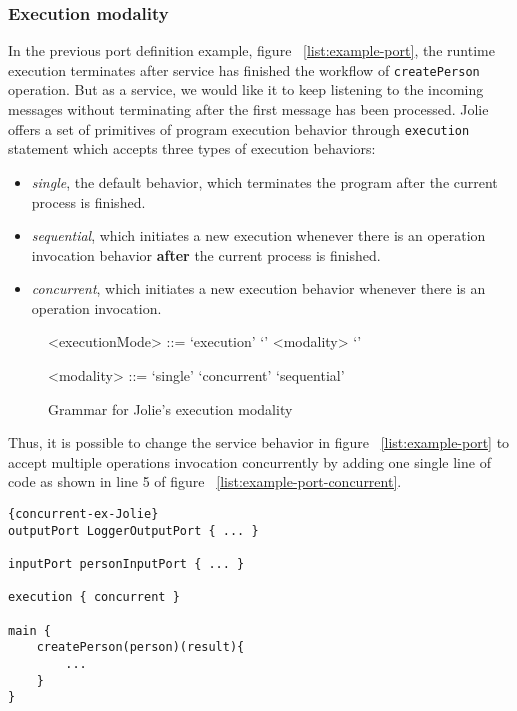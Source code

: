 \subsubsection{Execution modality}
\label{sec:jolie-execution-mode}

In the previous port definition example, figure ~\ref{list:example-port}, the runtime execution terminates after service has finished the workflow of \texttt{createPerson} operation. But as a service, we would like it to keep listening to the incoming messages without terminating after the first message has been processed.
Jolie offers a set of primitives of program execution behavior through \texttt{execution} statement which accepts three types of execution behaviors:

\begin{itemize}
    \item \textit{single}, the default behavior, which terminates the program after the current process is finished.
    \item \textit{sequential}, which initiates a new execution whenever there is an operation invocation behavior \textbf{after} the current process is finished.
    \item \textit{concurrent}, which initiates a new execution behavior whenever there is an operation invocation.
\end{itemize}

\begin{figure}[ht]
    \begin{framed}
        \begin{grammar}
            <executionMode>
            ::= `execution' `{' <modality> `}'

            <modality>
            ::= `single'
            \alt `concurrent'
            \alt `sequential'
        \end{grammar}
    \end{framed}
    \caption{Grammar for Jolie's execution modality}
    \label{fig:execution-mod-syntax}
\end{figure}

Thus, it is possible to change the service behavior in figure ~\ref{list:example-port} to accept multiple operations invocation concurrently by adding one single line of code as shown in line 5 of figure ~\ref{list:example-port-concurrent}.

\begin{listing}[ht]

    \lstset{language=Jolie,
        style=codeStyle,
        numbers=left,
        firstnumber=1
    }
    \begin{lstlisting}[frame=tlrb]{concurrent-ex-Jolie}
outputPort LoggerOutputPort { ... }

inputPort personInputPort { ... }

execution { concurrent }

main {
    createPerson(person)(result){
        ...
    }
}
\end{lstlisting}
\caption{Jolie implementation of the concurrent execution service}
\label{list:example-port-concurrent}
\end{listing}

\FloatBarrier